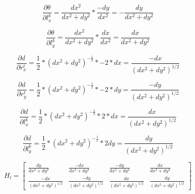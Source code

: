 \documentclass[12pt, a4paper]{article}
\begin{document}
$$\frac{\partial \theta}{\partial l_x^k} = \frac{dx^2}{dx^2 + dy^2} * \frac{-dy}{dx^2} = -\frac{dy}{dx^2 + dy^2}$$

$$\frac{\partial \theta}{\partial l_y^k} = \frac{dx^2}{dx^2 + dy^2} * \frac{dx}{dx^2} = \frac{dx}{dx^2 + dy^2}$$

$$\frac{\partial d}{\partial r_x^t} = \frac{1}{2} * (dx^2 + dy^2)^{-\frac{1}{2}} * -2 * dx = \frac{-dx}{(dx^2 + dy^2)^{1/2}}$$

$$\frac{\partial d}{\partial r_y^t} = \frac{1}{2} * (dx^2 + dy^2)^{-\frac{1}{2}} * -2 * dy = \frac{-dy}{(dx^2 + dy^2)^{1/2}}$$

$$\frac{\partial d}{\partial l_x^k} = \frac{1}{2} * (dx^2 + dy^2)^{-\frac{1}{2}} * 2 * dx = \frac{dx}{(dx^2 + dy^2)^{1/2}}$$

$$\frac{\partial d}{\partial l_y^k} = \frac{1}{2} * (dx^2 + dy^2)^{-\frac{1}{2}} * 2 dy = \frac{dy}{(dx^2 + dy^2)^{1/2}}$$


$$H_{l} = \begin{bmatrix}
    \frac{dy}{dx^2 + dy^2} & \frac{-dx}{dx^2 + dy^2} & \frac{-dy}{dx^2 + dy^2} & \frac{dx}{dx^2 + dy^2} \\
    \frac{-dx}{(dx^2 + dy^2)^{1/2}} & \frac{-dy}{(dx^2 + dy^2)^{1/2}}& \frac{dx}{(dx^2 + dy^2)^{1/2}} & \frac{dy}{(dx^2 + dy^2)^{1/2}}
\end{bmatrix}$$
\end{document}
